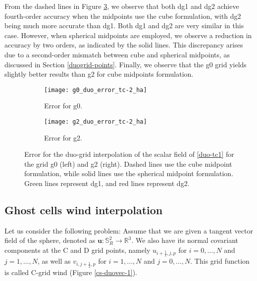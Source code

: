 From the dashed lines in Figure \ref{cs-tc1-error}, we observe that both dg1 and dg2 achieve fourth-order accuracy when the midpoints use the cube formulation, 
with dg2 being much more accurate than dg1.
Both dg1 and dg2 are very similar in this case.
However, when spherical midpoints are employed, we observe a reduction in accuracy by two orders, as indicated by the solid lines.
This discrepancy arises due to a second-order mismatch between cube and spherical midpoints, as discussed in Section \ref{duogrid-points}.
Finally, we observe that the g0 grid yields slightly better results than g2 for cube midpoints formulation.
\begin{figure}[!htb]
	\centering
	\begin{subfigure}{0.45\textwidth}
		\centering
		\texttt{[image: g0\_duo\_error\_tc-2\_ha]}
		\caption{Error for g0.\label{cs-duoscalar-tc1-g0}}
	\end{subfigure}
	\begin{subfigure}{0.45\textwidth}
		\centering
		\texttt{[image: g2\_duo\_error\_tc-2\_ha]}
		\caption{Error for g2.\label{cs-duoscalar-tc1-g2}}
	\end{subfigure}
	\caption{Error for the duo-grid interpolation of the scalar field of \eqref{duo-tc1} for the grid g0 (left) and g2 (right).
Dashed lines use the cube midpoint formulation, while solid lines use the spherical midpoint formulation.
Green lines represent dg1, and red lines represent dg2.\label{cs-tc1-error}}
\end{figure}


\subsection{Ghost cells wind interpolation}
\label{cs-wind-interp}
Let us consider the following problem: Assume that we are given a tangent vector field of the sphere, denoted as 
$\boldsymbol{u}:\mathbb{S}^2_R \to \mathbb{R}^3$. We also have its normal covariant components at the C and D grid points, namely $u_{i+\frac{1}{2},j,p}$ for $i=0, \ldots, N$ and $j=1, \ldots, N$, as well as
$v_{i,j+\frac{1}{2},p}$ for $i=1, \ldots, N$ and $j=0, \ldots, N$. This grid function is called C-grid wind (Figure \ref{cs-duovec-1}).

